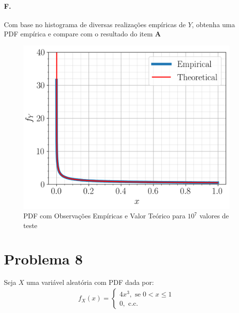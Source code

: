 \documentclass{article}
\begin{document}
\paragraph*{F.} Com base no histograma de diversas realizações empíricas de $Y$, obtenha uma PDF
empírica e compare com o resultado do item \textbf{A}
\begin{figure}[H]
    \centering
    \caption{PDF com Observações Empíricas e Valor Teórico para $10^7$ valores de teste}
    \includegraphics[width=0.8\linewidth]{py/7f.png}
\end{figure}

\section*{Problema 8}
Seja $X$ uma variável aleatória com PDF dada por:
\begin{align*}
    f_X(x) =
    \begin{cases}
        4x^3, \text{ se } 0 < x \le 1 \\
        0, \text{ c.c.}
    \end{cases}
\end{align*}
\end{document}
